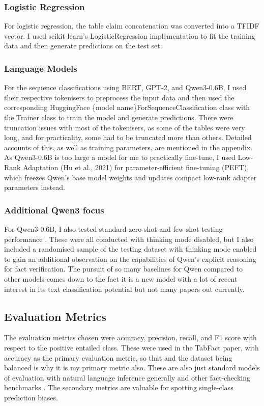 \subsubsection{Logistic Regression}
\noindent For logistic regression, the table claim concatenation was converted into a TFIDF vector. I used scikit-learn’s \parencite{pedregosa2011scikit} LogisticRegression implementation to fit the training data and then generate predictions on the test set.

\subsubsection{Language Models}
\noindent For the sequence classifications using BERT, GPT-2, and Qwen3-0.6B, I used their respective tokenisers to preprocess the input data and then used the corresponding HuggingFace \{model name\}ForSequenceClassification class with the Trainer class to train the model and generate predictions. There were truncation issues with most of the tokenisers, as some of the tables were very long, and for practicality, some had to be truncated more than others. Detailed accounts of this, as well as training parameters, are mentioned in the appendix. As Qwen3-0.6B is too large a model for me to practically fine-tune, I used Low-Rank Adaptation (Hu et al., 2021) for parameter-efficient fine-tuning (PEFT), which freezes Qwen’s base model weights and updates compact low-rank adapter parameters instead.

\subsubsection{Additional Qwen3 focus}
\noindent For Qwen3-0.6B, I also tested standard zero-shot and few-shot testing performance \parencite{brown2020language}. These were all conducted with thinking mode disabled, but I also included a randomised sample of the testing dataset with thinking mode enabled to gain an additional observation on the capabilities of Qwen's explicit reasoning for fact verification. The pursuit of so many baselines for Qwen compared to other models comes down to the fact it is a new model with a lot of recent interest in its text classification potential but not many papers out currently.

\subsection{Evaluation Metrics}
\noindent The evaluation metrics chosen were accuracy, precision, recall, and F1 score \parencite{sokolova2009systematic} with respect to the positive entailed class. These were used in the TabFact paper, with accuracy as the primary evaluation metric, so that and the dataset being balanced is why it is my primary metric also. These are also just standard models of evaluation with natural language inference generally \parencite{bowman2015large} and other fact-checking benchmarks \parencite{thorne2018fever}. The secondary metrics are valuable for spotting single-class prediction biases.


